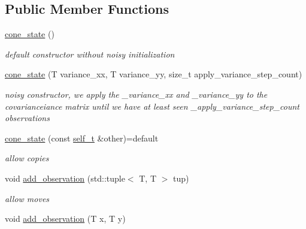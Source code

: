 \subsection*{Public Member Functions}
\begin{DoxyCompactItemize}
\item 
\mbox{\label{classclara_1_1cone__state_ae5d6874f1cadb2db4253e10ee09a225b}} 
\hyperlink{classclara_1_1cone__state_ae5d6874f1cadb2db4253e10ee09a225b}{cone\+\_\+state} ()
\begin{DoxyCompactList}\small\item\em default constructor without noisy initialization \end{DoxyCompactList}\item 
\mbox{\label{classclara_1_1cone__state_a1bb8472c6d3149945484a5bf68fde09f}} 
\hyperlink{classclara_1_1cone__state_a1bb8472c6d3149945484a5bf68fde09f}{cone\+\_\+state} (T variance\+\_\+xx, T variance\+\_\+yy, size\+\_\+t apply\+\_\+variance\+\_\+step\+\_\+count)
\begin{DoxyCompactList}\small\item\em noisy constructor, we apply the \+\_\+variance\+\_\+xx and \+\_\+variance\+\_\+yy to the covarianceiance matrix until we have at least seen \+\_\+apply\+\_\+variance\+\_\+step\+\_\+count observations \end{DoxyCompactList}\item 
\mbox{\label{classclara_1_1cone__state_ad98e1336401b69e680c42b0959a827a5}} 
\hyperlink{classclara_1_1cone__state_ad98e1336401b69e680c42b0959a827a5}{cone\+\_\+state} (const \hyperlink{classclara_1_1cone__state_a74ce83ddac5e4056fd4bb1e7d217f9f8}{self\+\_\+t} \&other)=default
\begin{DoxyCompactList}\small\item\em allow copies \end{DoxyCompactList}\item 
void \hyperlink{classclara_1_1cone__state_aee0e3d2bf97a5b06b8a052bf4c93f6ed}{add\+\_\+observation} (std\+::tuple$<$ T, T $>$ tup)
\begin{DoxyCompactList}\small\item\em allow moves \end{DoxyCompactList}\item 
void \hyperlink{classclara_1_1cone__state_a7cd7364ca787c25b0ca333d0cb1c3081}{add\+\_\+observation} (T x, T y)

\end{DoxyCompactItemize}

